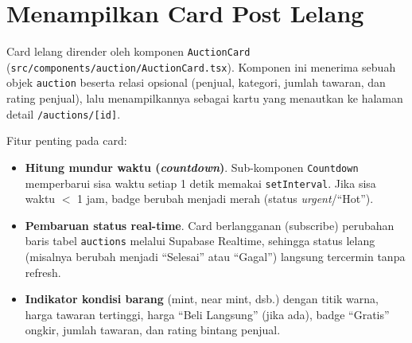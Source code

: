 
%
%
% 

\section{Menampilkan Card Post Lelang}
\label{sec:card-lelang}

Card lelang dirender oleh komponen \texttt{AuctionCard}
(\texttt{src/components/auction/AuctionCard.tsx}). Komponen ini menerima
sebuah objek \texttt{auction} beserta relasi opsional (penjual, kategori,
jumlah tawaran, dan rating penjual), lalu menampilkannya sebagai kartu yang
menautkan ke halaman detail \texttt{/auctions/[id]}.

Fitur penting pada card:
\begin{itemize}
  \item \textbf{Hitung mundur waktu (\emph{countdown})}. Sub-komponen
  \texttt{Countdown} memperbarui sisa waktu setiap 1 detik memakai
  \texttt{setInterval}. Jika sisa waktu $<$ 1 jam, badge berubah menjadi
  merah (status \emph{urgent}/``Hot'').
  \item \textbf{Pembaruan status real-time}. Card berlangganan (subscribe)
  perubahan baris tabel \texttt{auctions} melalui Supabase Realtime, sehingga
  status lelang (misalnya berubah menjadi ``Selesai'' atau ``Gagal'')
  langsung tercermin tanpa refresh.
  \item \textbf{Indikator kondisi barang} (mint, near mint, dsb.) dengan
  titik warna, harga tawaran tertinggi, harga ``Beli Langsung'' (jika ada),
  badge ``Gratis'' ongkir, jumlah tawaran, dan rating bintang penjual.
\end{itemize}

